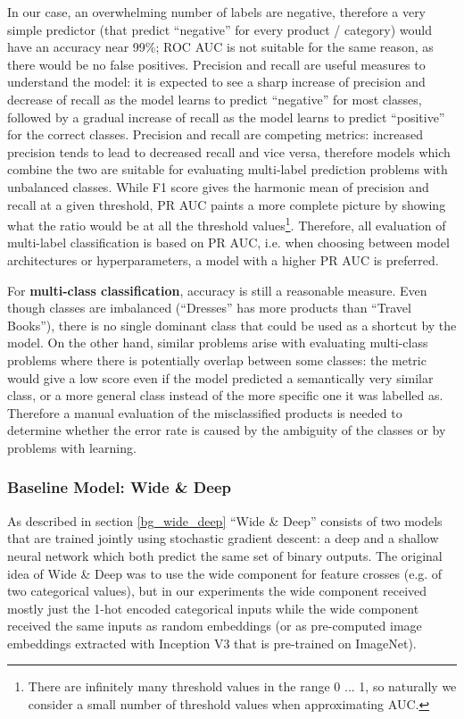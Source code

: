 In our case, an overwhelming number of labels are negative, therefore a very simple predictor (that predict ``negative'' for every product / category) would have an accuracy near 99\%; ROC AUC is not suitable for the same reason, as there would be no false positives.
Precision and recall are useful measures to understand the model: it is expected to see a sharp increase of precision and decrease of recall as the model learns to predict ``negative'' for most classes, followed by a gradual increase of recall as the model learns to predict ``positive'' for the correct classes.
Precision and recall are competing metrics: increased precision tends to lead to decreased recall and vice versa, therefore models which combine the two are suitable for evaluating multi-label prediction problems with unbalanced classes.
While F1 score gives the harmonic mean of precision and recall at a given threshold, PR AUC paints a more complete picture by showing what the ratio would be at all the threshold values\footnote{There are infinitely many threshold values in the range 0 ... 1, so naturally we consider a small number of threshold values when approximating AUC.}.
Therefore, all evaluation of multi-label classification is based on PR AUC, i.e. when choosing between model architectures or hyperparameters, a model with a higher PR AUC is preferred.

For \textbf{multi-class classification}, accuracy is still a reasonable measure.
Even though classes are imbalanced (``Dresses'' has more products than ``Travel Books''), there is no single dominant class that could be used as a shortcut by the model.
On the other hand, similar problems arise with evaluating multi-class problems where there is potentially overlap between some classes: the metric would give a low score even if the model predicted a semantically very similar class, or a more general class instead of the more specific one it was labelled as.
Therefore a manual evaluation of the misclassified products is needed to determine whether the error rate is caused by the ambiguity of the classes or by problems with learning.

\subsubsection{Baseline Model: Wide \& Deep}
\label{widedeep}

As described in section \ref{bg_wide_deep} ``Wide \& Deep'' consists of two models that are trained jointly using stochastic gradient descent: a deep and a shallow neural network which both predict the same set of binary outputs.
The original idea of Wide \& Deep was to use the wide component for feature crosses (e.g. of two categorical values), but in our experiments the wide component received mostly just the 1-hot encoded categorical inputs while the wide component received the same inputs as random embeddings (or as pre-computed image embeddings extracted with Inception V3 that is pre-trained on ImageNet).


